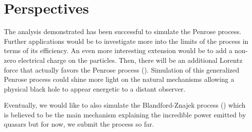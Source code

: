 \section{Perspectives}
\label{Sec5}

The analysis demonstrated has been successful to simulate the Penrose process. Further applications would be to investigate more into the limits of the process in terms of its efficiency. An even more interesting extension would be to add a non-zero electrical charge on the particles. Then, there will be an additional Lorentz force that actually favors the Penrose process (\cite{PenroseProcessCharged}). Simulation of this generalized Penrose process could shine more light on the natural mechanisms allowing a physical black hole to appear energetic to a distant observer.

Eventually, we would like to also simulate the Blandford-Znajek process (\cite{Blandford1977}) which is believed to be the main mechanism explaining the incredible power emitted by quasars but for now, we submit the process so far.
